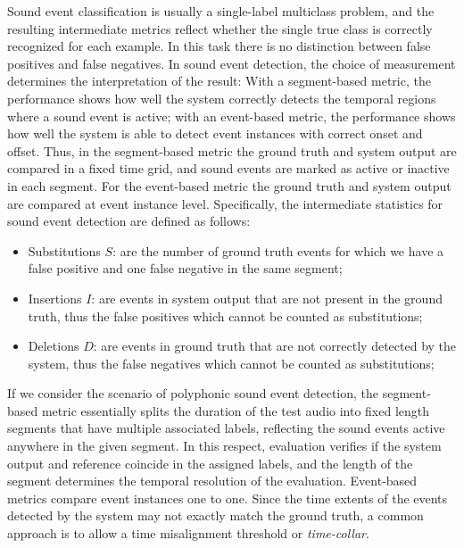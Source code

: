 Sound event classification is usually a single-label multiclass problem, and the resulting intermediate metrics reflect whether the single true class is correctly recognized for each example. In this task there is no distinction between false positives and false negatives. 
In sound event detection, the choice of measurement determines the interpretation of the result: With a segment-based metric, the performance shows how well the system correctly detects the temporal regions where a sound event is
active; with an event-based metric, the performance shows how well the system is able to detect event instances with correct onset and offset. Thus, in the segment-based metric the ground truth and system output are compared in a fixed time grid, and sound events are marked as active or inactive in each segment. For the event-based metric the ground truth and system output are compared at event instance level. Specifically, the intermediate statistics for sound event detection are defined as follows:

\begin{itemize}	
	\item Substitutions $S$: are the number of ground truth events for which we have a false positive and one false negative in the same segment; %
	\item Insertions $I$: are events in system output that are not present in the ground truth, thus the false positives which cannot be counted as substitutions;%
	
	\item Deletions $D$: are events in ground truth that are not correctly detected by the system, thus the false negatives which cannot be counted as substitutions;%
\end{itemize}

If we consider the scenario of polyphonic sound event detection, the segment-based metric essentially
splits the duration of the test audio into fixed length segments that have multiple associated labels, reflecting the sound events active anywhere in the given segment. In this respect, evaluation verifies if the system output and reference coincide in the assigned labels, and the length of the segment determines the temporal resolution of the evaluation. 
Event-based metrics compare event instances one to one. Since the time extents of the events detected by the system may not exactly match the ground truth, a common approach is to allow a time misalignment threshold or \textit{time-collar}.

